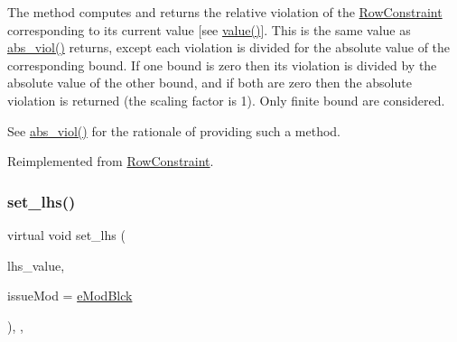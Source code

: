 The method computes and returns the relative violation of the \mbox{\hyperlink{class_s_m_spp__di__unipi__it_1_1_row_constraint}{Row\+Constraint}} corresponding to its current value \mbox{[}see \mbox{\hyperlink{class_s_m_spp__di__unipi__it_1_1_one_var_constraint_ad9256be16b98f3b557f54fa5e2118db7}{value()}}\mbox{]}. This is the same value as \mbox{\hyperlink{class_s_m_spp__di__unipi__it_1_1_l_b_constraint_a1e06e555eab5078e4d5ec16745778984}{abs\+\_\+viol()}} returns, except each violation is divided for the absolute value of the corresponding bound. If one bound is zero then its violation is divided by the absolute value of the other bound, and if both are zero then the absolute violation is returned (the scaling factor is 1). Only finite bound are considered.

See \mbox{\hyperlink{class_s_m_spp__di__unipi__it_1_1_l_b_constraint_a1e06e555eab5078e4d5ec16745778984}{abs\+\_\+viol()}} for the rationale of providing such a method. 

Reimplemented from \mbox{\hyperlink{class_s_m_spp__di__unipi__it_1_1_row_constraint_ab62e87cff922e3aa37b8a0b5644b4ecc}{Row\+Constraint}}.

\mbox{\label{class_s_m_spp__di__unipi__it_1_1_l_b_constraint_a307924d9ed36541d2a4fc32494c087ee}} 
\subsubsection{\texorpdfstring{set\+\_\+lhs()}{set\_lhs()}}
{\footnotesize\ttfamily virtual void set\+\_\+lhs (\begin{DoxyParamCaption}\item[{\mbox{\hyperlink{class_s_m_spp__di__unipi__it_1_1_row_constraint_a34abd4b01d3a2024be5f6d13dd88779f}{c\+\_\+\+R\+H\+S\+Value}}}]{lhs\+\_\+value,  }\item[{\mbox{\hyperlink{group___modification___t_y_p_e_s_ga544246d8c462e9a2d817c2c30797968f}{c\+\_\+\+Mod\+Param}}}]{issue\+Mod = {\ttfamily \mbox{\hyperlink{group___modification___t_y_p_e_s_gga48fddcdd03a03f49b7e389ca1ed938d4a21b14b26b1c0093a0905f6fc010bad29}{e\+Mod\+Blck}}} }\end{DoxyParamCaption})\hspace{0.3cm}{\ttfamily [final]}, {\ttfamily [override]}, {\ttfamily [virtual]}}



